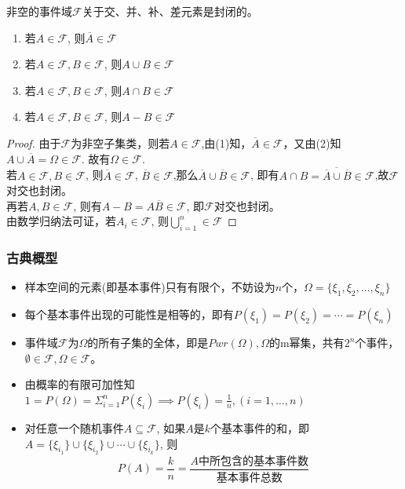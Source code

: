 \documentclass[xcolor=svgnames,serif,table,10pt]{beamer}
\begin{document}
\begin{frame}
	非空的事件域$\mathcal{F}$关于交、并、补、差元素是封闭的。
	\begin{enumerate}
		\item 若$A\in\mathcal{F}$, 则$\overline{A}\in\mathcal{F}$
		\item 若$A\in\mathcal{F},B\in\mathcal{F}$, 则$A\cup B\in \mathcal{F}$
		\item 若$A\in\mathcal{F},B\in\mathcal{F}$, 则$A\cap B\in \mathcal{F}$
		\item 若$A\in\mathcal{F},B\in\mathcal{F}$, 则$A- B\in \mathcal{F}$
	\end{enumerate}
	\begin{proof}
		由于$\mathcal{F}$为非空子集类，则若$A\in\mathcal{F}$,由(1)知，$\overline{A}\in\mathcal{F}$，又由(2)知$A\cup\overline{A}=\Omega\in\mathcal{F}$. 故有$\Omega\in\mathcal{F}$. \\
		若$A\in\mathcal{F},B\in\mathcal{F}$, 则$\overline{A}\in\mathcal{F}$, $\overline{B}\in\mathcal{F}$,那么$\overline{A}\cup\overline{B}\in\mathcal{F}$, 即有$A\cap B=\overline{\overline{A}\cup\overline{B}}\in\mathcal{F}$,故$\mathcal{F}$对交也封闭。\\
		再若$A,B\in\mathcal{F}$, 则有$A-B=A\overline{B}\in\mathcal{F}$, 即$\mathcal{F}$对交也封闭。\\
		由数学归纳法可证，若$A_i\in\mathcal{F}$, 则$\bigcup_{i=1}^{n}\in\mathcal{F}$
	\end{proof}
\end{frame}

\begin{frame}
\frametitle{古典概型}
\begin{itemize}
	\item 样本空间的元素(即基本事件)只有有限个，不妨设为$n$个，$\Omega=\{\xi_1,\xi_2,\dots,\xi_n\}$
	\item 每个基本事件出现的可能性是相等的，即有$P(\xi_1)=P(\xi_2)=\cdots=P(\xi_n)$
	\item 事件域$\mathcal{F}$为$\Omega$的所有子集的全体，即是$Pwr(\Omega),\Omega$的m幂集，共有$2^n$个事件，$\emptyset\in\mathcal{F},\Omega\in\mathcal{F}$。
	\item 由概率的有限可加性知\\
	$1=P(\Omega)=\Sigma_{i=1}^{n}P(\xi_i)\implies P(\xi_i)=\frac{1}{n},(i=1,\dots,n)$
	\item 对任意一个随机事件$A\subseteq\mathcal{F}$, 如果$A$是$k$个基本事件的和，即$A=\{\xi_{i_1}\}\cup \{\xi_{i_2}\}\cup\cdots\cup\{\xi_{i_k}\}$, 则
	$$P(A)=\frac{k}{n}=\frac{\text{$A$中所包含的基本事件数}}{\text{基本事件总数}}$$
\end{itemize}
\end{frame}
\end{document}
